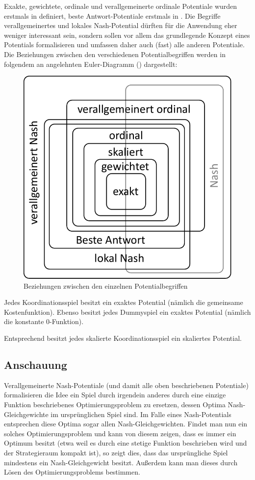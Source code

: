 Exakte, gewichtete, ordinale und verallgemeinerte ordinale Potentiale wurden erstmals in \cite{MonShap} definiert, beste Antwort-Potentiale erstmals in \cite{BestRespPot}. Die Begriffe verallgemeinertes und lokales Nash-Potential dürften für die Anwendung eher weniger interessant sein, sondern sollen vor allem das grundlegende Konzept eines Potentials formalisieren und umfassen daher auch (fast) alle anderen Potentiale. Die Beziehungen zwischen den verschiedenen Potentialbegriffen werden in folgendem an \cite{BestRespPot} angelehnten Euler-Diagramm () dargestellt:

\begin{figure}[h]\centering
	\includegraphics[width=.4\textwidth]{../Bilder/EulerDiagPotentiale.pdf}
	\caption{Beziehungen zwischen den einzelnen Potentialbegriffen}\label{diag:Potentiale}
\end{figure}



\begin{bsp}
	Jedes Koordinationsspiel besitzt ein exaktes Potential (nämlich die gemeinsame Kostenfunktion). Ebenso besitzt jedes Dummyspiel ein exaktes Potential (nämlich die konstante $0$-Funktion).
	
	Entsprechend besitzt jedes skalierte Koordinationsspiel ein skaliertes Potential.
\end{bsp}

\subsection{Anschauung}

Verallgemeinerte Nash-Potentiale (und damit alle oben beschriebenen Potentiale) formalisieren die Idee ein Spiel durch irgendein anderes durch eine einzige Funktion beschriebenes Optimierungsproblem zu ersetzen, dessen Optima Nash-Gleichgewichte im ursprünglichen Spiel sind. Im Falle eines Nash-Potentials entsprechen diese Optima sogar allen Nash-Gleichgewichten. Findet man nun ein solches Optimierungsproblem und kann von diesem zeigen, dass es immer ein Optimum besitzt (etwa weil es durch eine stetige Funktion beschrieben wird und der Strategieraum kompakt ist), so zeigt dies, dass das ursprüngliche Spiel mindestens ein Nash-Gleichgewicht besitzt. Außerdem kann man dieses durch Lösen des Optimierungsproblems bestimmen.

